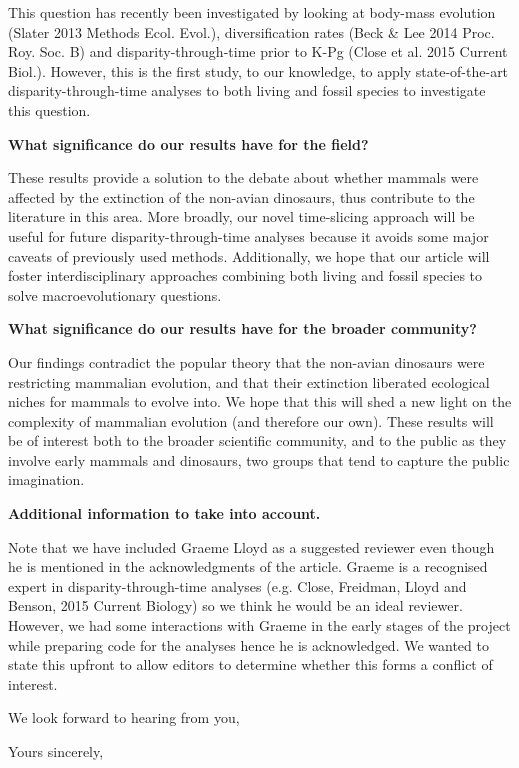 \documentclass[11pt]{letter}
\begin{document}
\begin{letter}{}
This question has recently been investigated by looking at body-mass evolution (Slater 2013 Methods Ecol. Evol.), diversification rates (Beck \& Lee 2014 Proc. Roy. Soc. B) and disparity-through-time prior to K-Pg (Close et al. 2015 Current Biol.).
However, this is the first study, to our knowledge, to apply state-of-the-art disparity-through-time analyses to both living and fossil species to investigate this question.

\textbf{What significance do our results have for the field?}

These results provide a solution to the debate about whether mammals were affected by the extinction of the non-avian dinosaurs, thus contribute to the literature in this area.
More broadly, our novel time-slicing approach will be useful for future disparity-through-time analyses because it avoids some major caveats of previously used methods.
Additionally, we hope that our article will foster interdisciplinary approaches combining both living and fossil species to solve macroevolutionary questions.

\textbf{What significance do our results have for the broader community?}

Our findings contradict the popular theory that the non-avian dinosaurs were restricting mammalian evolution, and that their extinction liberated ecological niches for mammals to evolve into.
We hope that this will shed a new light on the complexity of mammalian evolution (and therefore our own).
These results will be of interest both to the broader scientific community, and to the public as they involve early mammals and dinosaurs, two groups that tend to capture the public imagination.


\textbf{Additional information to take into account.}

Note that we have included Graeme Lloyd as a suggested reviewer even though he is mentioned in the acknowledgments of the article.
Graeme is a recognised expert in disparity-through-time analyses (e.g. Close, Freidman, Lloyd and Benson, 2015 Current Biology) so we think he would be an ideal reviewer.
However, we had some interactions with Graeme in the early stages of the project while preparing code for the analyses hence he is acknowledged.
We wanted to state this upfront to allow editors to determine whether this forms a conflict of interest.

We look forward to hearing from you,

\closing{Yours sincerely,}




\end{letter}
\end{document}
